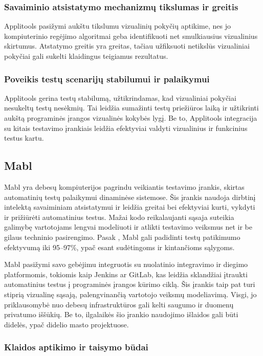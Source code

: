 \documentclass[
]{VUMIFPSkursinis}
\begin{document}
\subsubsection{Savaiminio atsistatymo mechanizmų tikslumas ir greitis}

Applitools pasižymi aukštu tikslumu vizualinių pokyčių aptikime, nes jo kompiuterinio regėjimo algoritmai geba identifikuoti net smulkiausius vizualinius skirtumus. Atstatymo greitis yra greitas, tačiau užfiksuoti netikslūs vizualiniai pokyčiai gali sukelti klaidingus teigiamus rezultatus.

\subsubsection{Poveikis testų scenarijų stabilumui ir palaikymui}

Applitools gerina testų stabilumą, užtikrindamas, kad vizualiniai pokyčiai nesukeltų testų nesėkmių. Tai leidžia sumažinti testų priežiūros laiką ir užtikrinti aukštą programinės įrangos vizualinės kokybės lygį. Be to, Applitools integracija su kitais testavimo įrankiais leidžia efektyviai valdyti vizualinius ir funkcinius testus kartu.

\subsection{Mabl}
Mabl yra debesų kompiuterijos pagrindu veikiantis testavimo įrankis, skirtas automatinių testų palaikymui dinaminėse sistemose. Šis įrankis naudoja dirbtinį intelektą savaiminiam atsistatymui ir leidžia greitai bei efektyviai kurti, vykdyti ir prižiūrėti automatinius testus. Mažai kodo reikalaujanti sąsaja suteikia galimybę vartotojams lengvai modeliuoti ir atlikti testavimo veiksmus net ir be gilaus techninio pasirengimo. Pasak \cite{Garousi2024}, Mabl gali padidinti testų patikimumo efektyvumą iki 95–97\%, ypač esant sudėtingoms ir kintančioms sąlygoms.

Mabl pasižymi savo gebėjimu integruotis su nuolatinio integravimo ir diegimo platformomis, tokiomis kaip Jenkins ar GitLab, kas leidžia sklandžiai įtraukti automatinius testus į programinės įrangos kūrimo ciklą. Šis įrankis taip pat turi stiprią vizualinę sąsają, palengvinančią vartotojo veiksmų modeliavimą. Visgi, jo priklausomybė nuo debesų infrastruktūros gali kelti saugumo ir duomenų privatumo iššūkių. Be to, ilgalaikės šio įrankio naudojimo išlaidos gali būti didelės, ypač didelio masto projektuose.\cite{Mabl}

\subsubsection{Klaidos aptikimo ir taisymo būdai}
\end{document}
